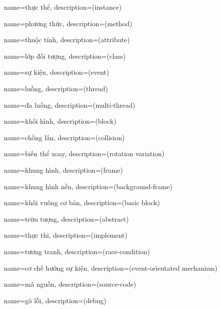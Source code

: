 {
    name={thực thể},
    description={(instance)}
}

{
    name={phương thức},
    description={(method)}
}

{
    name={thuộc tính},
    description={(attribute)}
}

{
    name={lớp đối tượng},
    description={(class)}
}

{
    name={sự kiện},
    description={(event)}
}

{
    name={luồng},
    description={(thread)}
}

{
    name={đa luồng},
    description={(multi-thread)}
}

{
    name={khối hình},
    description={(block)}
}

{
    name={chồng lấn},
    description={(collision)}
}

{
    name={biến thể xoay},
    description={(rotation variation)}
}

{
    name={khung hình},
    description={(frame)}
}

{
    name={khung hình nền},
    description={(background-frame)}
}

{
    name={khối vuông cơ bản},
    description={(basic block)}
}

{
    name={trừu tượng},
    description={(abstract)}
}

{
    name={thực thi},
    description={(implement)}
}

{
    name={tương tranh},
    description={(race-condition)}
}

{
    name={cơ chế hướng sự kiện},
    description={(event-orientated mechanism)}
}

{
    name={mã nguồn},
    description={(source-code)}
}

{
    name={gõ lỗi},
    description={(debug)}
}

